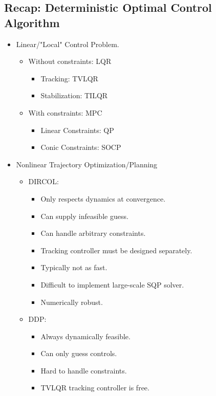\subsection{Recap: Deterministic Optimal Control Algorithm}
\begin{itemize}
    \item Linear/"Local" Control Problem.
    \begin{itemize}
        \item Without constraints: LQR
        \begin{itemize}
            \item Tracking: TVLQR
            \item Stabilization: TILQR
        \end{itemize}
        \item With constraints: MPC
        \begin{itemize}
            \item Linear Constraints: QP
            \item Conic Constraints: SOCP
        \end{itemize}
    \end{itemize}
    \item Nonlinear Trajectory Optimization/Planning
    \begin{itemize}
        \item DIRCOL:
        \begin{itemize}
            \item Only respects dynamics at convergence.
            \item Can supply infeasible guess.
            \item Can handle arbitrary constraints.
            \item Tracking controller must be designed separately.
            \item Typically not as fast.
            \item Difficult to implement large-scale SQP solver.
            \item Numerically robust.
        \end{itemize}
        \item DDP:
        \begin{itemize}
            \item Always dynamically feasible.
            \item Can only guess controls.
            \item Hard to handle constraints.
            \item TVLQR tracking controller is free.

\end{itemize}
\end{itemize}
\end{itemize}
